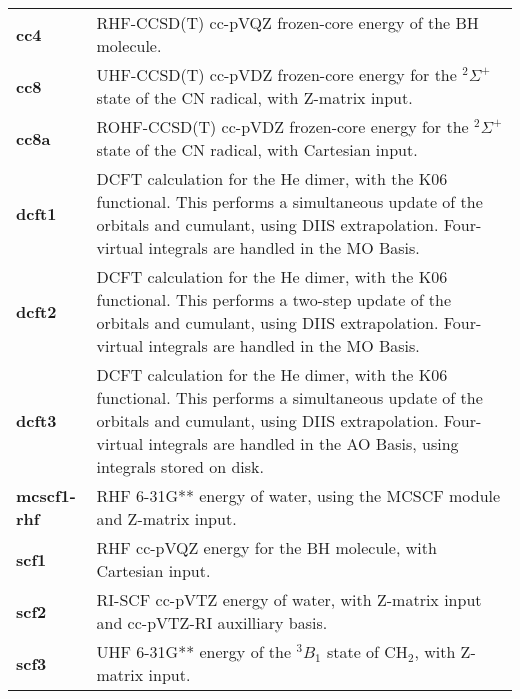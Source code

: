 \begin{tabular*}{\textwidth}[tb]{p{}p{}}
{\bf cc4} &  RHF-CCSD(T) cc-pVQZ frozen-core energy of the BH molecule.\\
{\bf cc8} &  UHF-CCSD(T) cc-pVDZ frozen-core energy for the $^2\Sigma^+$ state of the CN radical, with Z-matrix input.\\
{\bf cc8a} &  ROHF-CCSD(T) cc-pVDZ frozen-core energy for the $^2\Sigma^+$ state of the CN radical, with Cartesian input.\\
{\bf dcft1} &  DCFT calculation for the He dimer, with the K06 functional. This performs a simultaneous update of the orbitals and cumulant, using DIIS extrapolation. Four-virtual integrals are handled in the MO Basis.\\
{\bf dcft2} &  DCFT calculation for the He dimer, with the K06 functional. This performs a two-step update of the orbitals and cumulant, using DIIS extrapolation. Four-virtual integrals are handled in the MO Basis.\\
{\bf dcft3} &  DCFT calculation for the He dimer, with the K06 functional. This performs a simultaneous update of the orbitals and cumulant, using DIIS extrapolation. Four-virtual integrals are handled in the AO Basis, using integrals stored on disk.\\
{\bf mcscf1-rhf} &  RHF 6-31G** energy of water, using the MCSCF module and Z-matrix input.\\
{\bf scf1} &  RHF cc-pVQZ energy for the BH molecule, with Cartesian input.\\
{\bf scf2} &  RI-SCF cc-pVTZ energy of water, with Z-matrix input and cc-pVTZ-RI auxilliary basis.\\
{\bf scf3} &  UHF 6-31G** energy of the $^3B_1$ state of CH$_2$, with Z-matrix input.\\
\end{tabular*}